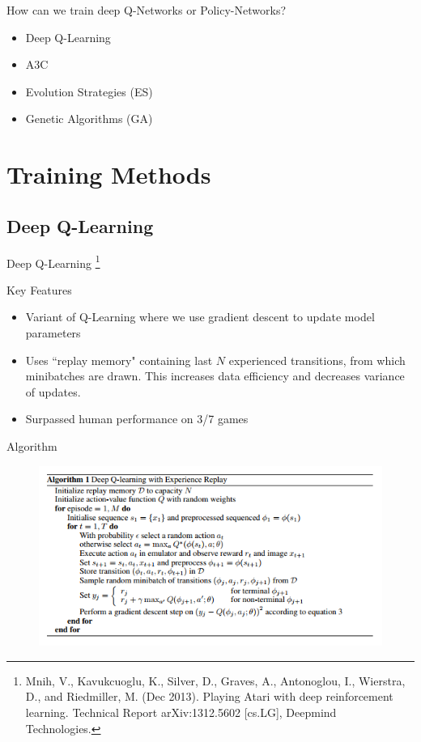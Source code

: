 \documentclass{beamer}
\begin{document}
	\begin{frame}{How can we train deep Q-Networks or Policy-Networks?}
		\begin{itemize}
			\item Deep Q-Learning
			\item A3C
			\item Evolution Strategies (ES)
			\item Genetic Algorithms (GA)
		\end{itemize}
	\end{frame}
	
	\section*{Training Methods}
	
	\subsection*{Deep Q-Learning}
	
	\begin{frame}
		\Huge Deep Q-Learning
		\footnote{Mnih, V., Kavukcuoglu, K., Silver, D., Graves, A., Antonoglou, I., Wierstra, D., and Riedmiller, M.
(Dec 2013). Playing Atari with deep reinforcement learning. Technical Report arXiv:1312.5602
[cs.LG], Deepmind Technologies.}
	\end{frame}
	
	\begin{frame}{Key Features}
		\begin{itemize}
			\item Variant of Q-Learning where we use gradient descent to update model parameters
			\item Uses ``replay memory" containing last $N$ experienced transitions, from which minibatches are drawn. This increases data efficiency and decreases variance of updates.
			\item Surpassed human performance on 3/7 games
		\end{itemize}
	\end{frame}
	
	\begin{frame}{Algorithm}
		\begin{figure}
			\centering
			\includegraphics[height=0.7\textheight]{dqn_algorithm.png}
		\end{figure}
	\end{frame}
	
\end{document}

